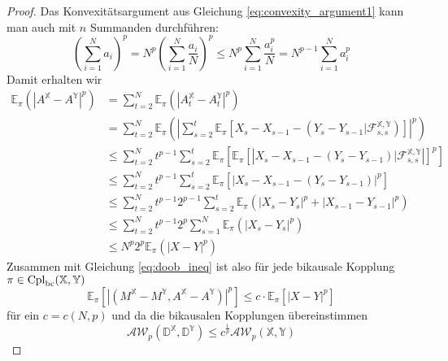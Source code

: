 \begin{proof}
    Das Konvexitätsargument aus Gleichung \ref{eq:convexity_argument1} kann man auch mit $n$ Summanden durchführen: 
    $$\left(\sum_{i=1}^N a_i\right)^p = N^{p} \left(\sum_{i=1}^N \frac{a_i}{N}\right)^p \leq N^p \sum_{i=1}^N \frac{a_i^p}{N} = N^{p-1} \sum_{i=1}^N a_i^p$$
    Damit erhalten wir 
    \begin{align*}
        \mathbb{E}_\pi(|A^\mathbb{X} - A^\mathbb{Y}|^p) &= \sum_{t=2}^N\mathbb{E}_\pi(|A_t^\mathbb{X} - A_t^\mathbb{Y}|^p) \\
        &= \sum_{t=2}^N \mathbb{E}_\pi\left(\left| \sum_{s=2}^t \mathbb{E}_\pi\left[X_s - X_{s-1} - (Y_s - Y_{s-1} \vert \mathcal{F}_{s,s}^\mathbb{X,Y}) \right]\right|^p \right) \\
        &\leq \sum_{t=2}^N t^{p-1} \sum_{s=2}^t \mathbb{E}_\pi\left[\mathbb{E}_\pi\left[ \left|X_s - X_{s-1} - (Y_s - Y_{s-1}) \vert \mathcal{F}_{s,s}^\mathbb{X,Y} \right|\right]^p\right] \\
        &\leq \sum_{t=2}^N t^{p-1}\sum_{s=2}^t \mathbb{E}_\pi\left[ \left|X_{s}-X_{s-1} - (Y_s - Y_{s-1}) \right|^p\right] \\
        &\leq \sum_{t=2}^N t^{p-1}2^{p-1}\sum_{s=2}^t \mathbb{E}_\pi(|X_s - Y_{s}|^p + |X_{s-1}-Y_{s-1}|^p) \\
        &\leq \sum_{t=2}^N t^{p-1}2^{p} \sum_{s=1}^N \mathbb{E}_\pi(|X_s - Y_s|^p) \\
        &\leq N^p2^p \mathbb{E}_\pi(|X-Y|^p)
    \end{align*}
    Zusammen mit Gleichung \ref{eq:doob_ineq} ist also für jede bikausale Kopplung $\pi \in \operatorname{Cpl}_{\operatorname{bc}}(\mathbb{X,Y})$
    $$\mathbb{E}_\pi\left[\left|(M^\mathbb{X}-M^\mathbb{Y}, A^\mathbb{X}-A^\mathbb{Y}) \right|^p \right]  \leq c\cdot \mathbb{E}_\pi \left[ \left| X-Y\right|^p\right]$$
    für ein $c=c(N,p)$ und da die bikausalen Kopplungen übereinstimmen
    $$\mathcal{AW}_p(\mathbb{D}^\mathbb{X}, \mathbb{D}^\mathbb{Y}) \leq c^\frac{1}{p} \mathcal{AW}_p(\mathbb{X,Y})$$
\end{proof}
